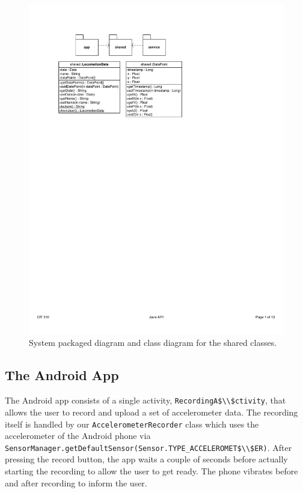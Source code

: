 \documentclass{ubicomp2012}
\begin{document}
\begin{figure}[th]
\begin{center}
\includegraphics[width=0.90\columnwidth]{figures/class-diagram.pdf}
\end{center}
\caption{System packaged diagram and class diagram for the shared classes.}
\label{fig:classDiagram}
\end{figure}

\subsection{The Android App}

The Android app consists of a single activity, \lstinline[mathescape]{RecordingA$\\$ctivity}, that allows the user to record and upload a set of accelerometer data. The recording itself is handled by our \lstinline[mathescape]{AccelerometerRecorder} class which uses the accelerometer of the Android phone via \lstinline[mathescape]{SensorManager.getDefaultSensor(Sensor.TYPE_ACCELEROMET$\\$ER)}.
After pressing the record button, the app waits a couple of seconds before actually starting the recording to allow the user to get ready. The phone vibrates before and after recording to inform the user.
\end{document}
